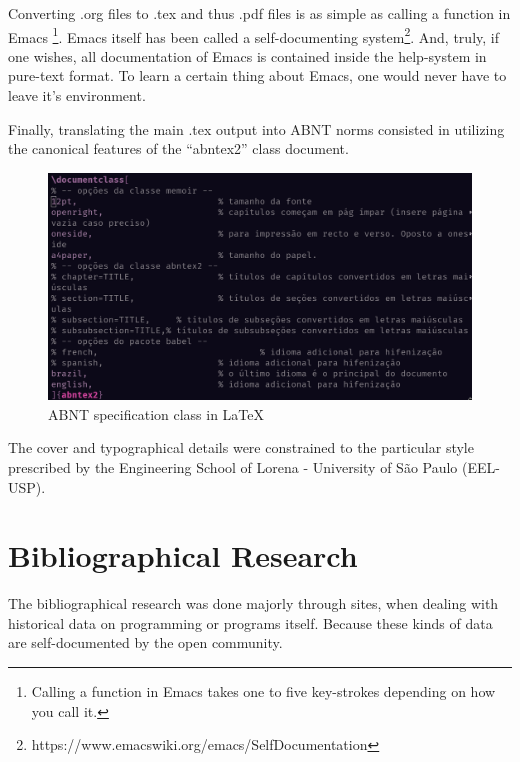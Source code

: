 \documentclass[
12pt,				%
openright,			%
oneside,			%
a4paper,			%
brazil,				%
english,			  %
]{abntex2}
\begin{document}
Converting .org files to .tex and thus .pdf files is as
simple as calling a function in Emacs \footnote{Calling a function in
  Emacs takes one to five key-strokes
depending on how you call it.}. Emacs itself has been called a
self-documenting system\footnote{https://www.emacswiki.org/emacs/SelfDocumentation}. And, truly, if one wishes, all documentation
of Emacs is contained inside the help-system in pure-text format. To
learn a certain thing about Emacs, one would never have to leave it's
environment.

Finally, translating the main .tex output into ABNT norms consisted in
utilizing the canonical features of the ``abntex2'' class document.

\begin{figure}[ht]
  \centering
  \caption{\label{fig:abntex} ABNT specification class in LaTeX}
  \includegraphics[width=\linewidth]{abnt.png}
\end{figure}

The cover and typographical details were constrained to the particular
style prescribed by the Engineering School of Lorena - University of
São Paulo (EEL-USP).

\section{Bibliographical Research}

The bibliographical research was done majorly through sites, when
dealing with historical data on programming or programs
itself. Because these kinds of data are self-documented by the open
community.
\end{document}
